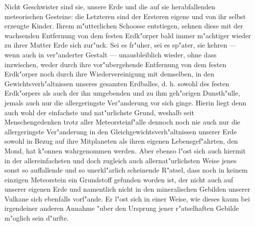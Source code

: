 \documentclass[a4paper, 8pt, oneside, polutonikogreek, german]{article}
\begin{document}
Nicht Geschwister sind sie, unsere Erde und die auf sie herabfallenden meteorischen Gesteine: die Letzteren sind der Ersteren eigene und von ihr selbst erzeugte Kinder. Ihrem m"utterlichen Schoosse entstiegen, sehnen diese mit der wachsenden Entfernung von dem festen Erdk"orper bald immer m"achtiger wieder zu ihrer Mutter Erde sich zur"uck. Sei es fr"uher, sei es sp"ater, sie kehren --- wenn auch in ver"anderter Gestalt --- unausbleiblich wieder, ohne dass inzwischen, weder durch ihre vor"ubergehende Entfernung von dem festen Erdk"orper noch durch ihre Wiedervereinigung mit demselben, in den Gewichtsverh"altnissen unseres gesamten Erdballes, d. h. sowohl des festen Erdk"orpers als auch der ihn umgebenden und zu ihm geh"origen Dunsth"ulle, jemals auch nur die allergeringste Ver"anderung vor sich ginge. Hierin liegt denn auch wohl der einfachste und nat"urlichste Grund, weshalb seit Menschengedenken trotz aller Meteorsteinf"alle dennoch noch nie auch nur die allergeringste Ver"anderung in den Gleichgewichtsverh"altnissen unserer Erde sowohl in Bezug auf ihre Mitplaneten als ihren eigenen Lebensgef"ahrten, den Mond, hat k"onnen wahrgenommen werden. Aber ebenso l"ost sich auch hiermit in der allereinfachsten und doch zugleich auch allernat"urlichsten Weise jenes sonst so auffallende und so unerkl"arlich scheinende R"atsel, dass noch in keinem einzigen Meteorstein ein Grundstoff gefunden worden ist, der nicht auch auf unserer eigenen Erde und namentlich nicht in den mineralischen Gebilden unserer Vulkane sich ebenfalls vorf"ande. Er l"ost sich in einer Weise, wie dieses kaum bei irgendeiner anderen Annahme "uber den Ursprung jener r"atselhaften Gebilde m"oglich sein d"urfte.
\end{document}

